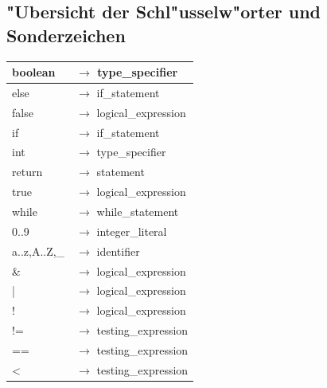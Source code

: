 \documentclass[10pt,a4paper,titlepage]{article}
\begin{document}
\subsection{"Ubersicht der Schl"usselw"orter und Sonderzeichen}
\begin{ttfamily}
\begin{tabular}{| l  l |}
\hline
\hspace*{1cm}boolean & $\to$ type\_specifier\hspace*{2cm}\\\hline
\hspace*{1cm}else & $\to$ if\_statement\hspace*{2cm}\\\hline
\hspace*{1cm}false & $\to$ logical\_expression\\\hline
\hspace*{1cm}if & $\to$ if\_statement\\\hline
\hspace*{1cm}int & $\to$ type\_specifier\\\hline
\hspace*{1cm}return & $\to$ statement\\\hline
\hspace*{1cm}true & $\to$ logical\_expression\\\hline
\hspace*{1cm}while & $\to$ while\_statement\\\hline
\hspace*{1cm}0..9 & $\to$ integer\_literal\\\hline
\hspace*{1cm}a..z,A..Z,\_\hspace*{0.5cm} & $\to$ identifier\\\hline
\hspace*{1cm}\& & $\to$ logical\_expression\\\hline
\hspace*{1cm}| & $\to$ logical\_expression\\\hline
\hspace*{1cm}! & $\to$ logical\_expression\\\hline
\hspace*{1cm}!= & $\to$ testing\_expression\\\hline
\hspace*{1cm}== & $\to$ testing\_expression\\\hline
\hspace*{1cm}< & $\to$ testing\_expression\\\hline

\end{tabular}
\end{ttfamily}
\end{document}
